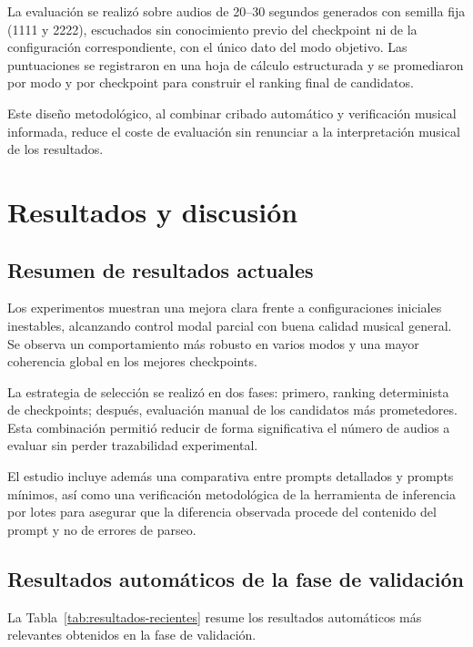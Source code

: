 \documentclass[%
    school=etsisi,%
    type=pfg,%
    degree=61CD,%
]{upm-report}
\begin{document}
La evaluaci\'on se realiz\'o sobre audios de 20--30 segundos generados con semilla fija (1111 y 2222), escuchados sin conocimiento previo del checkpoint ni de la configuraci\'on correspondiente, con el \'unico dato del modo objetivo. Las puntuaciones se registraron en una hoja de c\'alculo estructurada y se promediaron por modo y por checkpoint para construir el ranking final de candidatos.

Este dise\~no metodol\'ogico, al combinar cribado autom\'atico y verificaci\'on musical informada, reduce el coste de evaluaci\'on sin renunciar a la interpretaci\'on musical de los resultados.

\chapter{Resultados y discusi\'on}
\label{ch:resultados}

\section{Resumen de resultados actuales}

Los experimentos muestran una mejora clara frente a configuraciones iniciales inestables, alcanzando control modal parcial con buena calidad musical general. Se observa un comportamiento m\'as robusto en varios modos y una mayor coherencia global en los mejores checkpoints.

La estrategia de selecci\'on se realiz\'o en dos fases: primero, ranking determinista de checkpoints; despu\'es, evaluaci\'on manual de los candidatos m\'as prometedores. Esta combinaci\'on permiti\'o reducir de forma significativa el n\'umero de audios a evaluar sin perder trazabilidad experimental.

El estudio incluye adem\'as una comparativa entre prompts detallados y prompts m\'inimos, as\'i como una verificaci\'on metodol\'ogica de la herramienta de inferencia por lotes para asegurar que la diferencia observada procede del contenido del prompt y no de errores de parseo.

\section{Resultados autom\'aticos de la fase de validaci\'on}

La Tabla~\ref{tab:resultados-recientes} resume los resultados autom\'aticos m\'as relevantes obtenidos en la fase de validaci\'on.
\end{document}
